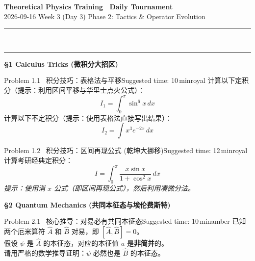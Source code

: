 \documentclass[a4paper,11pt]{article}
\begin{document}
\begin{center}
  {\LARGE\bfseries\color{navy} Theoretical Physics Training \textperiodcentered\ Daily Tournament}\\[3pt]
  {\small\sffamily\color{mist} 2026-09-16 \quad\textbar\quad Week 3 (Day 3) \quad\textbar\quad Phase 2: Tactics \& Operator Evolution}\\[-4pt]
  {\color{navy}\rule{\textwidth}{0.8pt}}\\[-11pt]
  {\color{border}\rule{\textwidth}{0.3pt}}
\end{center}

{\Large\sffamily\bfseries\color{navy} \S 1 Calculus Tricks (微积分大招区)}
\vspace{4pt}

\begin{problembox}{Problem 1.1 \textbar\ 积分技巧：表格法与平移}{Suggested time: 10\,min}{royal}
计算以下定积分（提示：利用区间平移与华里士点火公式）：
\[ I_1 = \int_0^\pi \sin^6 x \, dx \]
计算以下不定积分（提示：使用表格法直接写出结果）：
\[ I_2 = \int x^3 e^{-2x} \, dx \]
\end{problembox}
\vspace{10cm}

\begin{problembox}{Problem 1.2 \textbar\ 积分技巧：区间再现公式 (乾坤大挪移)}{Suggested time: 12\,min}{royal}
计算考研经典定积分：
\[ I = \int_0^\pi \frac{x \sin x}{1 + \cos^2 x} \, dx \]
\textit{提示：使用消 $x$ 公式（即区间再现公式），然后利用凑微分法。}
\end{problembox}
\vspace{10cm}

\clearpage
{\Large\sffamily\bfseries\color{navy} \S 2 Quantum Mechanics (共同本征态与埃伦费斯特)}
\vspace{4pt}

\begin{problembox}{Problem 2.1 \textbar\ 核心推导：对易必有共同本征态}{Suggested time: 10\,min}{amber}
已知两个厄米算符 $\hat{A}$ 和 $\hat{B}$ 对易，即 $[\hat{A}, \hat{B}] = 0$。\\
假设 $\psi$ 是 $\hat{A}$ 的本征态，对应的本征值 $a$ 是\textbf{非简并}的。\\
请用严格的数学推导证明：$\psi$ 必然也是 $\hat{B}$ 的本征态。
\end{problembox}
\vspace{11cm}
\end{document}
